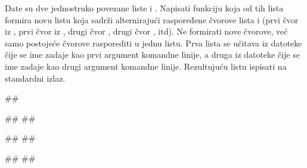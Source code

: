 \begin{Exercise}[label=610]
Date su dve jednostruko povezane liste  i . Napisati funkciju koja od 
tih lista formira novu listu  koja sadrži alternirajući raspoređene čvorove 
lista  i  (prvi čvor iz , prvi čvor iz , drugi čvor ,
drugi čvor , itd). Ne formirati nove čvorove, već samo postojeće čvorove 
rasporediti u jednu listu. Prva lista se učitava iz datoteke čije se ime zadaje kao prvi argument komandne linije, a druga iz datoteke čije se ime zadaje kao 
drugi argument komandne linije. Rezultujuću listu ispisati na standardni izlaz. 


\noindent
\begin{miditest}
\begin{test}{1}
##

##
##

##
##

#\naslovIzlaz#
##
\end{test}
\end{miditest}
\end{Exercise}
\begin{Answer}[ref=610]
\end{Answer}

